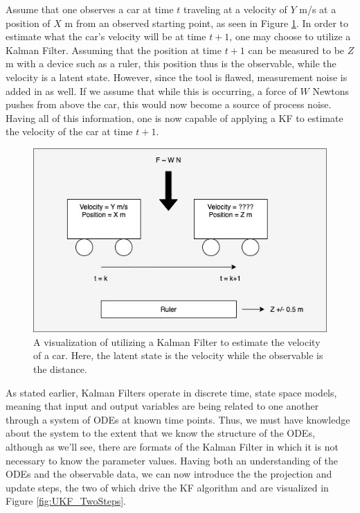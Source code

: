 Assume that one observes a car at time $t$ traveling at a velocity of $Y$ m/s at a position of $X$ m from an observed starting point, as seen in Figure \ref{fig:Car_Example}. In order to estimate what the car's velocity will be at time $t+1$, one may choose to utilize a Kalman Filter. Assuming that the position at time $t+1$ can be measured to be $Z$ m with a device such as a ruler, this position thus is the observable, while the velocity is a latent state. However, since the tool is flawed, measurement noise is added in as well. If we assume that while this is occurring, a force of $W$ Newtons pushes from above the car, this would now become a source of process noise. Having all of this information, one is now capable of applying a KF to estimate the velocity of the car at time $t+1$.\\

\begin{figure}[H]
    \centering
    \includegraphics[width=15cm]{Kalman_Filter_Images/Cart_Example.jpg}
    \caption{A visualization of utilizing a Kalman Filter to estimate the velocity of a car. Here, the latent state is the velocity while the observable is the distance.}
    \label{fig:Car_Example}
\end{figure}

As stated earlier, Kalman Filters operate in discrete time, state space models, meaning that input and output variables are being related to one another through a system of ODEs at known time points. Thus, we must have knowledge about the system to the extent that we know the structure of the ODEs, although as we'll see, there are formats of the Kalman Filter in which it is not necessary to know the parameter values. Having both an understanding of the ODEs and the observable data, we can now introduce the the projection and update steps, the two of which drive the KF algorithm and are visualized in Figure \ref{fig:UKF_TwoSteps}. 

